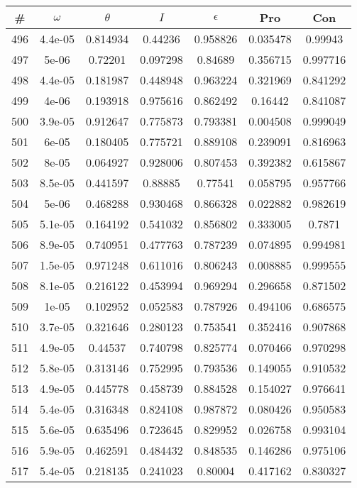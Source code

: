 \newpage
\begin{table}
\begin{tabular}{c|c|c|c|c|c|c}
\# & $\omega$ & $\theta$ & $I$ & $\epsilon$ & Pro & Con\\
\hline
496 & 4.4e-05 & 0.814934 & 0.44236 & 0.958826 & 0.035478 & 0.99943\\
497 & 5e-06 & 0.72201 & 0.097298 & 0.84689 & 0.356715 & 0.997716\\
498 & 4.4e-05 & 0.181987 & 0.448948 & 0.963224 & 0.321969 & 0.841292\\
499 & 4e-06 & 0.193918 & 0.975616 & 0.862492 & 0.16442 & 0.841087\\
500 & 3.9e-05 & 0.912647 & 0.775873 & 0.793381 & 0.004508 & 0.999049\\
501 & 6e-05 & 0.180405 & 0.775721 & 0.889108 & 0.239091 & 0.816963\\
502 & 8e-05 & 0.064927 & 0.928006 & 0.807453 & 0.392382 & 0.615867\\
503 & 8.5e-05 & 0.441597 & 0.88885 & 0.77541 & 0.058795 & 0.957766\\
504 & 5e-06 & 0.468288 & 0.930468 & 0.866328 & 0.022882 & 0.982619\\
505 & 5.1e-05 & 0.164192 & 0.541032 & 0.856802 & 0.333005 & 0.7871\\
506 & 8.9e-05 & 0.740951 & 0.477763 & 0.787239 & 0.074895 & 0.994981\\
507 & 1.5e-05 & 0.971248 & 0.611016 & 0.806243 & 0.008885 & 0.999555\\
508 & 8.1e-05 & 0.216122 & 0.453994 & 0.969294 & 0.296658 & 0.871502\\
509 & 1e-05 & 0.102952 & 0.052583 & 0.787926 & 0.494106 & 0.686575\\
510 & 3.7e-05 & 0.321646 & 0.280123 & 0.753541 & 0.352416 & 0.907868\\
511 & 4.9e-05 & 0.44537 & 0.740798 & 0.825774 & 0.070466 & 0.970298\\
512 & 5.8e-05 & 0.313146 & 0.752995 & 0.793536 & 0.149055 & 0.910532\\
513 & 4.9e-05 & 0.445778 & 0.458739 & 0.884528 & 0.154027 & 0.976641\\
514 & 5.4e-05 & 0.316348 & 0.824108 & 0.987872 & 0.080426 & 0.950583\\
515 & 5.6e-05 & 0.635496 & 0.723645 & 0.829952 & 0.026758 & 0.993104\\
516 & 5.9e-05 & 0.462591 & 0.484432 & 0.848535 & 0.146286 & 0.975106\\
517 & 5.4e-05 & 0.218135 & 0.241023 & 0.80004 & 0.417162 & 0.830327\\

\end{tabular}
\end{table}

